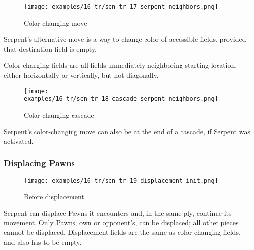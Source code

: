 \noindent
\begin{minipage}{\textwidth}
\begin{wrapfigure}[9]{l}{0.4\textwidth}
\centering
\texttt{[image: examples/16\_tr/scn\_tr\_17\_serpent\_neighbors.png]}
\caption{Color-changing move}
\label{fig:scn_tr_17_serpent_neighbors}
\end{wrapfigure}
Serpent's alternative move is a way to change color of accessible fields,
provided that destination field is empty.

\mbox{}\newline %
Color-changing fields are all fields immediately neighboring starting
location, either horizontally or vertically, but not diagonally.
\end{minipage}

\vspace*{2.9\baselineskip}
\noindent
\begin{minipage}{\textwidth}
\begin{wrapfigure}[3]{l}{0.4\textwidth}
\centering
\texttt{[image: examples/16\_tr/scn\_tr\_18\_cascade\_serpent\_neighbors.png]}
\caption{Color-changing cascade}
\label{fig:scn_tr_18_cascade_serpent_neighbors}
\end{wrapfigure}
Serpent's color-changing move can also be at the end of a cascade,
if Serpent was activated.
\end{minipage}

\clearpage %

\subsubsection*{Displacing Pawns}
\label{sec:Tamoanchan Revisited/Serpent/Movement/Displacing Pawns}

\noindent
\begin{wrapfigure}[9]{l}{0.4\textwidth}
\centering
\texttt{[image: examples/16\_tr/scn\_tr\_19\_displacement\_init.png]}
\vspace*{-0.5\baselineskip}
\caption{Before displacement}
\label{fig:scn_tr_19_displacement_init}
\end{wrapfigure}
Serpent can displace Pawns it encounters and, in the same ply, continue its movement.
Only Pawns, own or opponent's, can be displaced; all other pieces cannot be displaced.\newline
\indent
Displacement fields are the same as color-changing fields, and also has to be empty.

